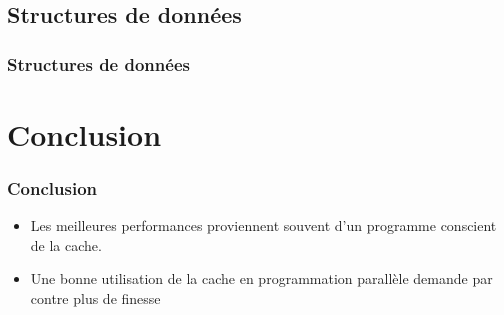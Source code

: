 \documentclass{beamer}
\begin{document}
\subsection{Structures de données}
\begin{frame}
\frametitle{Structures de données}

\end{frame}

\section{Conclusion}
\begin{frame}
\frametitle{Conclusion}
\begin{itemize}
\item Les meilleures performances proviennent souvent d'un programme conscient de la cache.
\item<2-> Une bonne utilisation de la cache en programmation parallèle demande par contre plus de finesse
\end{itemize}
\end{frame}
\end{document}
